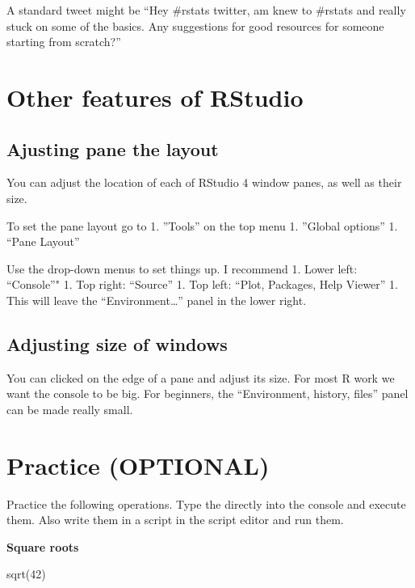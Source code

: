 \documentclass[
]{book}
\newenvironment{Shaded}{\begin{snugshade}}{\end{snugshade}}
\newcommand{\DecValTok}[1]{\textcolor[rgb]{0.00,0.00,0.81}{#1}}
\newcommand{\FunctionTok}[1]{\textcolor[rgb]{0.00,0.00,0.00}{#1}}
\newcommand{\NormalTok}[1]{#1}
\begin{document}
A standard tweet might be
``Hey \#rstats twitter, am knew to \#rstats and really stuck on some of the basics. Any suggestions for good resources for someone starting from scratch?''

\hypertarget{other-features-of-rstudio}{%
\section{Other features of RStudio}\label{other-features-of-rstudio}}

\hypertarget{ajusting-pane-the-layout}{%
\subsection{Ajusting pane the layout}\label{ajusting-pane-the-layout}}

You can adjust the location of each of RStudio 4 window panes, as well as their size.

To set the pane layout go to
1. ''Tools'' on the top menu
1. ''Global options''
1. ``Pane Layout''

Use the drop-down menus to set things up. I recommend
1. Lower left: ``Console''"
1. Top right: ``Source''
1. Top left: ``Plot, Packages, Help Viewer''
1. This will leave the ``Environment\ldots{}'' panel in the lower right.

\hypertarget{adjusting-size-of-windows}{%
\subsection{Adjusting size of windows}\label{adjusting-size-of-windows}}

You can clicked on the edge of a pane and adjust its size. For most R work we want the console to be big. For beginners, the ``Environment, history, files'' panel can be made really small.

\hypertarget{practice-optional}{%
\section{Practice (OPTIONAL)}\label{practice-optional}}

Practice the following operations. Type the directly into the console and execute them. Also write them in a script in the script editor and run them.

\textbf{Square roots}

\begin{Shaded}
\begin{Highlighting}[]
\FunctionTok{sqrt}\NormalTok{(}\DecValTok{42}\NormalTok{)}
\end{Highlighting}
\end{Shaded}
\end{document}
